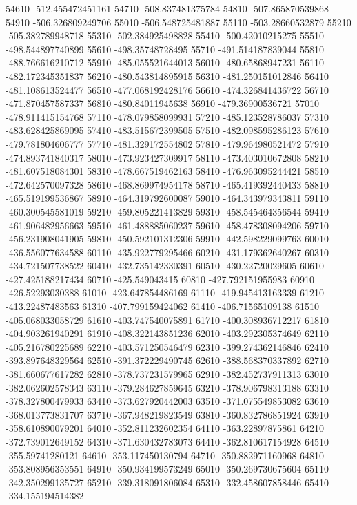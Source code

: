 {54610 -512.455472451161
54710 -508.837481375784
54810 -507.865870539868
54910 -506.326809249706
55010 -506.548725481887
55110 -503.28660532879
55210 -505.382789948718
55310 -502.384925498828
55410 -500.42010215275
55510 -498.544897740899
55610 -498.35748728495
55710 -491.514187839044
55810 -488.766616210712
55910 -485.055521644013
56010 -480.65868947231
56110 -482.172345351837
56210 -480.543814895915
56310 -481.250151012846
56410 -481.108613524477
56510 -477.068192428176
56610 -474.326841436722
56710 -471.870457587337
56810 -480.84011945638
56910 -479.36900536721
57010 -478.911415154768
57110 -478.079858099931
57210 -485.123528786037
57310 -483.628425869095
57410 -483.515672399505
57510 -482.098595286123
57610 -479.781804606777
57710 -481.329172554802
57810 -479.964980521472
57910 -474.893741840317
58010 -473.923427309917
58110 -473.403010672808
58210 -481.607518084301
58310 -478.667519462163
58410 -476.963095244421
58510 -472.642570097328
58610 -468.869974954178
58710 -465.419392440433
58810 -465.519199536867
58910 -464.319792600087
59010 -464.343979343811
59110 -460.300545581019
59210 -459.805221413829
59310 -458.545464356544
59410 -461.906482956663
59510 -461.488885060237
59610 -458.478308094206
59710 -456.231908041905
59810 -450.592101312306
59910 -442.598229099763
60010 -436.556077634588
60110 -435.922779295466
60210 -431.179362640267
60310 -434.721507738522
60410 -432.735142330391
60510 -430.22720029605
60610 -427.425188217434
60710 -425.549043415
60810 -427.792151955983
60910 -426.52293030388
61010 -423.647854486169
61110 -419.945413163339
61210 -413.22487483563
61310 -407.799159424062
61410 -406.71565109138
61510 -405.068033058729
61610 -403.747540075891
61710 -400.308936712217
61810 -404.903261940291
61910 -408.322143851236
62010 -403.292305374649
62110 -405.216780225689
62210 -403.571250546479
62310 -399.274362146846
62410 -393.897648329564
62510 -391.372229490745
62610 -388.568370337892
62710 -381.660677617282
62810 -378.737231579965
62910 -382.452737911313
63010 -382.062602578343
63110 -379.284627859645
63210 -378.906798313188
63310 -378.327800479933
63410 -373.627920442003
63510 -371.075549853082
63610 -368.013773831707
63710 -367.948219823549
63810 -360.832786851924
63910 -358.610890079201
64010 -352.811232602354
64110 -363.22897875861
64210 -372.739012649152
64310 -371.630432783073
64410 -362.810617154928
64510 -355.59741280121
64610 -353.117450130794
64710 -350.882971160968
64810 -353.808956353551
64910 -350.934199573249
65010 -350.269730675604
65110 -342.350299135727
65210 -339.318091806084
65310 -332.458607858446
65410 -334.155194514382
}
